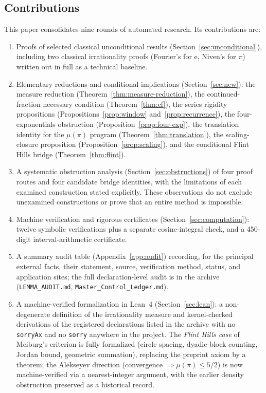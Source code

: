 \documentclass[11pt]{amsart}
\theoremstyle{definition}
\theoremstyle{remark}
\numberwithin{equation}{section}
\newcommand{\irr}{\mu}
\newcommand{\ee}{\mathrm{e}}
\begin{document}
\subsection{Contributions} This paper consolidates nine rounds of automated research. Its contributions are:
\begin{enumerate}
\item Proofs of selected classical unconditional results (Section~\ref{sec:unconditional}), including two classical irrationality proofs (Fourier's for $\ee$, Niven's for $\pi$) written out in full as a technical baseline.
\item Elementary reductions and conditional implications (Section~\ref{sec:new}): the measure reduction (Theorem~\ref{thm:measure-reduction}), the continued-fraction necessary condition (Theorem~\ref{thm:cf}), the series rigidity propositions (Propositions~\ref{prop:window} and~\ref{prop:recurrence}), the four-exponentials obstruction (Proposition~\ref{prop:four-exp}), the translation identity for the $\irr(\pi)$ program (Theorem~\ref{thm:translation}), the scaling-closure proposition (Proposition~\ref{prop:scaling}), and the conditional Flint Hills bridge (Theorem~\ref{thm:flint}).
\item A systematic obstruction analysis (Section~\ref{sec:obstructions}) of four proof routes and four candidate bridge identities, with the limitations of each examined construction stated explicitly. These observations do not exclude unexamined constructions or prove that an entire method is impossible.
\item Machine verification and rigorous certificates (Section~\ref{sec:computation}): twelve symbolic verifications plus a separate cosine-integral check, and a 450-digit interval-arithmetic certificate.
\item A summary audit table (Appendix~\ref{app:audit}) recording, for the principal external facts, their statement, source, verification method, status, and application sites; the full declaration-level audit is in the archive (\texttt{LEMMA\_AUDIT.md}, \texttt{Master\_Control\_Ledger.md}).
\item A machine-verified formalization in Lean~4 (Section~\ref{sec:lean}): a non-degenerate definition of the irrationality measure and kernel-checked derivations of the registered declarations listed in the archive with no \texttt{sorryAx} and no \texttt{sorry} anywhere in the project. The \emph{Flint Hills case} of Meiburg's criterion is fully formalized (circle spacing, dyadic-block counting, Jordan bound, geometric summation), replacing the preprint axiom by a theorem; the Alekseyev direction (convergence $\Rightarrow\irr(\pi)\le5/2$) is now machine-verified via a nearest-integer argument, with the earlier density obstruction preserved as a historical record.

\end{enumerate}
\end{document}
